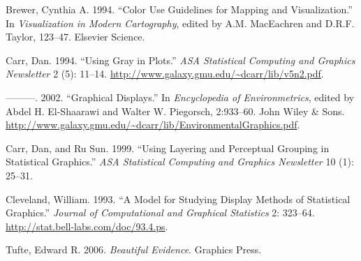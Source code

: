 \hypertarget{refs}{}
\hypertarget{ref-brewer:1994}{}
Brewer, Cynthia A. 1994. ``Color Use Guidelines for Mapping and
Visualization.'' In \emph{Visualization in Modern Cartography}, edited
by A.M. MacEachren and D.R.F. Taylor, 123--47. Elsevier Science.

\hypertarget{ref-carr:1994}{}
Carr, Dan. 1994. ``Using Gray in Plots.'' \emph{ASA Statistical
Computing and Graphics Newsletter} 2 (5): 11--14.
\url{http://www.galaxy.gmu.edu/~dcarr/lib/v5n2.pdf}.

\hypertarget{ref-carr:2002}{}
---------. 2002. ``Graphical Displays.'' In \emph{Encyclopedia of
Environmetrics}, edited by Abdel H. El-Shaarawi and Walter W. Piegorsch,
2:933--60. John Wiley \& Sons.
\url{http://www.galaxy.gmu.edu/~dcarr/lib/EnvironmentalGraphics.pdf}.

\hypertarget{ref-carr:1999}{}
Carr, Dan, and Ru Sun. 1999. ``Using Layering and Perceptual Grouping in
Statistical Graphics.'' \emph{ASA Statistical Computing and Graphics
Newsletter} 10 (1): 25--31.

\hypertarget{ref-cleveland:1993a}{}
Cleveland, William. 1993. ``A Model for Studying Display Methods of
Statistical Graphics.'' \emph{Journal of Computational and Graphical
Statistics} 2: 323--64. \url{http://stat.bell-labs.com/doc/93.4.ps}.

\hypertarget{ref-tufte:2006}{}
Tufte, Edward R. 2006. \emph{Beautiful Evidence}. Graphics Press.
